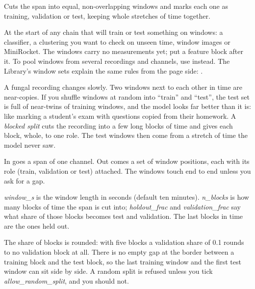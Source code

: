 Cuts the span into equal, non-overlapping windows and marks each one as training,
validation or test, keeping whole stretches of time together.

At the start of any chain that will train or test something on windows: a classifier, a
clustering you want to check on unseen time, window images or MiniRocket. The windows
carry no measurements yet; put a feature block after it. To pool windows from several
recordings and channels, use  instead. The Library's
window sets explain the same rules from the page side: .

\begin{plainterms}
A fungal recording changes slowly. Two windows next to each other in time are near-copies.
If you shuffle windows at random into ``train'' and ``test'', the test set is full of
near-twins of training windows, and the model looks far better than it is: like marking a
student's exam with questions copied from their homework. A \emph{blocked split} cuts the
recording into a few long blocks of time and gives each block, whole, to one role. The test
windows then come from a stretch of time the model never saw.
\end{plainterms}

In goes a span of one channel. Out comes a set of window positions, each with its role
(train, validation or test) attached. The windows touch end to end unless you ask for a gap.

\emph{window\_s} is the window length in seconds (default ten minutes). \emph{n\_blocks}
is how many blocks of time the span is cut into; \emph{holdout\_frac} and
\emph{validation\_frac} say what share of those blocks becomes test and validation. The
last blocks in time are the ones held out.

The share of blocks is rounded: with five blocks a validation share of 0.1 rounds to no
validation block at all. There is no empty gap at the border between a training block and
the test block, so the last training window and the first test window can sit side by
side. A random split is refused unless you tick \emph{allow\_random\_split}, and you
should not.

